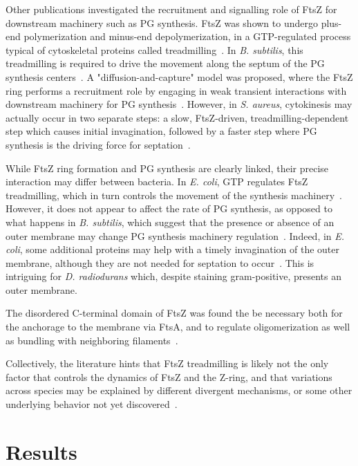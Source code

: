 Other publications investigated the recruitment and signalling role of FtsZ for downstream machinery such as PG synthesis.
FtsZ was shown to undergo plus-end polymerization and minus-end depolymerization, in a GTP-regulated process typical of cytoskeletal proteins called treadmilling~\cite{looseBacterialCellDivision2014}.
In \textit{B. subtilis}, this treadmilling is required to drive the movement along the septum of the PG synthesis centers~\cite{bisson-filhoTreadmillingFtsZFilaments2017}.
A "diffusion-and-capture" model was proposed, where the FtsZ ring performs a recruitment role by engaging in weak transient interactions with downstream machinery for PG synthesis~\cite{baranovaDiffusionCapturePermits2020}.
However, in \textit{S. aureus}, cytokinesis may actually occur in two separate steps: a slow, FtsZ-driven, treadmilling-dependent step which causes initial invagination, followed by a faster step where PG synthesis is the driving force for septation~\cite{monteiroPeptidoglycanSynthesisDrives2018}.

While FtsZ ring formation and PG synthesis are clearly linked, their precise interaction may differ between bacteria.
In \textit{E. coli}, GTP regulates FtsZ treadmilling, which in turn controls the movement of the synthesis machinery~\cite{yangGTPaseActivityCoupled2017}.
However, it does not appear to affect the rate of PG synthesis, as opposed to what happens in \textit{B. subtilis}, which suggest that the presence or absence of an outer membrane may change PG synthesis machinery regulation~\cite{yangGTPaseActivityCoupled2017}.
Indeed, in \textit{E. coli}, some additional proteins may help with a timely invagination of the outer membrane, although they are not needed for septation to occur~\cite{gerdingTransenvelopeTolPal2007}.
This is intriguing for \textit{D. radiodurans} which, despite staining gram-positive, presents an outer membrane.

The disordered C-terminal domain of FtsZ was found the be necessary both for the anchorage to the membrane via FtsA, and to regulate oligomerization as well as bundling with neighboring filaments~\cite{barrowsFtsZDynamicsBacterial2021}.

Collectively, the literature hints that FtsZ treadmilling is likely not the only factor that controls the dynamics of FtsZ and the Z-ring, and that variations across species may be explained by different divergent mechanisms, or some other underlying behavior not yet discovered~\cite{barrowsFtsZDynamicsBacterial2021}.

\section{Results}

